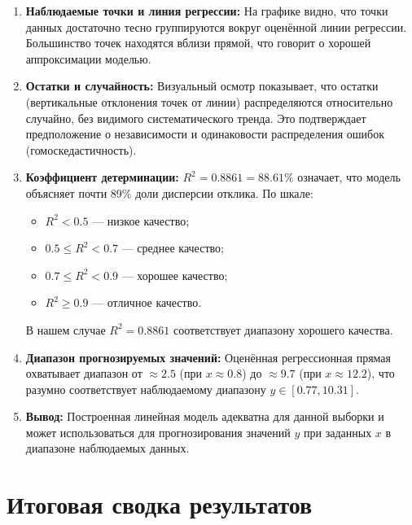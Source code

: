 \documentclass[12pt,a4paper]{article}
\begin{document}
\begin{enumerate}
\item \textbf{Наблюдаемые точки и линия регрессии:} На графике видно, что точки данных достаточно тесно группируются вокруг оценённой линии регрессии. Большинство точек находятся вблизи прямой, что говорит о хорошей аппроксимации моделью.

\item \textbf{Остатки и случайность:} Визуальный осмотр показывает, что остатки (вертикальные отклонения точек от линии) распределяются относительно случайно, без видимого систематического тренда. Это подтверждает предположение о независимости и одинаковости распределения ошибок (гомоскедастичность).

\item \textbf{Коэффициент детерминации:} $R^2 = 0.8861 = 88.61\%$ означает, что модель объясняет почти 89\% доли дисперсии отклика. По шкале:
\begin{itemize}
\item $R^2 < 0.5$ — низкое качество;
\item $0.5 \le R^2 < 0.7$ — среднее качество;
\item $0.7 \le R^2 < 0.9$ — хорошее качество;
\item $R^2 \ge 0.9$ — отличное качество.
\end{itemize}
В нашем случае $R^2 = 0.8861$ соответствует диапазону хорошего качества.

\item \textbf{Диапазон прогнозируемых значений:} Оценённая регрессионная прямая охватывает диапазон от $\approx 2.5$ (при $x \approx 0.8$) до $\approx 9.7$ (при $x \approx 12.2$), что разумно соответствует наблюдаемому диапазону $y \in [0.77, 10.31]$.

\item \textbf{Вывод:} Построенная линейная модель адекватна для данной выборки и может использоваться для прогнозирования значений $y$ при заданных $x$ в диапазоне наблюдаемых данных.
\end{enumerate}

\section{Итоговая сводка результатов}
\end{document}
